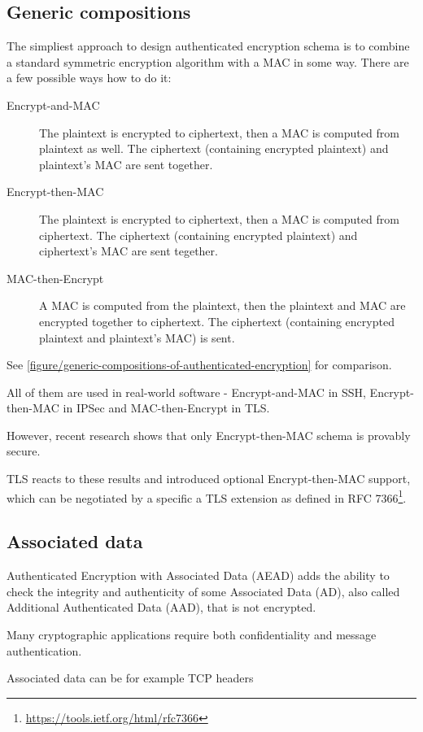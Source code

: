 \subsection{Generic compositions}



The simpliest approach to design authenticated encryption schema is to combine a standard symmetric encryption algorithm with a MAC in some way. There are a few possible ways how to do it:

\begin{description}
  \item[Encrypt-and-MAC] The plaintext is encrypted to ciphertext, then a MAC is computed from plaintext as well. The ciphertext (containing encrypted plaintext) and plaintext's MAC are sent together.
  \item[Encrypt-then-MAC] The plaintext is encrypted to ciphertext, then a MAC is computed from ciphertext. The ciphertext (containing encrypted plaintext) and ciphertext's MAC are sent tegether.
  \item[MAC-then-Encrypt] A MAC is computed from the plaintext, then the plaintext and MAC are encrypted together to ciphertext. The ciphertext (containing encrypted plaintext and plaintext's MAC) is sent.
\end{description}

See \autoref{figure/generic-compositions-of-authenticated-encryption} for comparison.

All of them are used in real-world software - Encrypt-and-MAC in SSH, Encrypt-then-MAC in IPSec and MAC-then-Encrypt in TLS.

However, recent research shows that only Encrypt-then-MAC schema is provably secure. \cite{generic-ae} \cite{generic-ae2}

TLS reacts to these results and introduced optional Encrypt-then-MAC support, which can be negotiated by a specific a TLS extension as defined in RFC 7366\footnote{\url{https://tools.ietf.org/html/rfc7366}}.

\subsection{Associated data}

Authenticated Encryption with Associated Data (AEAD) adds the ability to check the integrity and authenticity of some Associated Data (AD), also called Additional Authenticated Data (AAD), that is not encrypted.

Many cryptographic applications require both confidentiality and message authentication.

Associated data can be for example TCP headers

